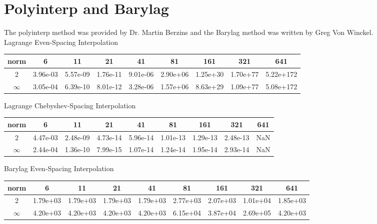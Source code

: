 \documentclass{article}
\begin{document}
\section{Polyinterp and Barylag}

The polyinterp method was provided by Dr. Martin Berzins and the Barylag method was written by Greg Von Winckel.\\

Lagrange Even-Spacing Interpolation
\begin{center}
\begin{tabular}{| c | c | c | c | c | c | c | c | c |}
\hline norm & 6 & 11 & 21 & 41 & 81 & 161 & 321 & 641 \\ \hline \hline 
2 & 3.96e-03 & 5.57e-09 &  1.76e-11 & 9.01e-06 &  2.90e+06 & 1.25e+30 &  1.70e+77 & 5.22e+172 \\ \hline 
$\infty$ & 3.05e-04 & 6.39e-10 &  8.01e-12 & 3.28e-06 &  1.57e+06 & 8.63e+29 &  1.09e+77 & 5.08e+172 \\ \hline 
\end{tabular}
\end{center}

Lagrange Chebyshev-Spacing Interpolation
\begin{center}
\begin{tabular}{| c | c | c | c | c | c | c | c | c |}
\hline norm & 6 & 11 & 21 & 41 & 81 & 161 & 321 & 641 \\ \hline \hline 
2 & 4.47e-03 & 2.48e-09 &  4.73e-14 & 5.96e-14 &  1.01e-13 & 1.29e-13 &  2.48e-13 &  NaN \\ \hline 
$\infty$ & 2.44e-04 & 1.36e-10 &  7.99e-15 & 1.07e-14 &  1.24e-14 & 1.95e-14 &  2.93e-14 &  NaN \\ \hline 
\end{tabular}
\end{center}

Barylag Even-Spacing Interpolation
\begin{center}
\begin{tabular}{| c | c | c | c | c | c | c | c | c |}
\hline norm & 6 & 11 & 21 & 41 & 81 & 161 & 321 & 641 \\ \hline \hline 
2 & 1.79e+03 & 1.79e+03 &  1.79e+03 & 1.79e+03 &  2.77e+03 & 2.07e+03 &  1.01e+04 & 1.85e+03 \\ \hline 
$\infty$ & 4.20e+03 & 4.20e+03 &  4.20e+03 & 4.20e+03 &  6.15e+04 & 3.87e+04 &  2.69e+05 & 4.20e+03 \\ \hline 
\end{tabular}
\end{center}
\end{document}
